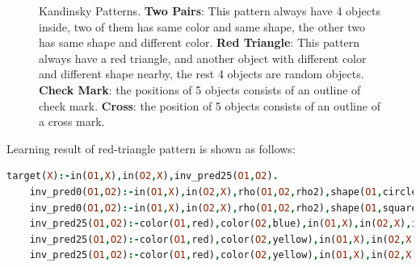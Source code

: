\documentclass[
]{ceurart}
\begin{document}
\begin{figure}[!htb]
	\centering
	\caption{Kandinsky Patterns. \textbf{Two Pairs}: This pattern always have 4 objects inside, two of them has same color and same shape, the other two has same shape and different color. \textbf{Red Triangle}: This pattern always have a red triangle, and another object with different color and different shape nearby, the rest 4 objects are random objects. \textbf{Check Mark}: the positions of 5 objects consists of an outline of check mark. \textbf{Cross}: the position of 5 objects consists of an outline of a cross mark.}
	\label{fig:kandinsky-patterns}
\end{figure}


Learning result of red-triangle pattern is shown as follows:

\begin{lstlisting}[language=Prolog, mathescape]
	target(X):-in(O1,X),in(O2,X),inv_pred25(O1,O2).
	inv_pred0(O1,O2):-in(O1,X),in(O2,X),rho(O1,O2,rho2),shape(O1,circle).
	inv_pred0(O1,O2):-in(O1,X),in(O2,X),rho(O1,O2,rho2),shape(O1,square).
	inv_pred25(O1,O2):-color(O1,red),color(O2,blue),in(O1,X),in(O2,X),inv_pred0(O2,O1),shape(O1,triangle).
	inv_pred25(O1,O2):-color(O1,red),color(O2,yellow),in(O1,X),in(O2,X),inv_pred0(O2,O1),shape(O1,triangle).
	inv_pred25(O1,O2):-color(O1,red),color(O2,yellow),in(O1,X),in(O2,X),inv_pred0(O2,O1),shape(O2,circle).
\end{lstlisting}
\end{document}
